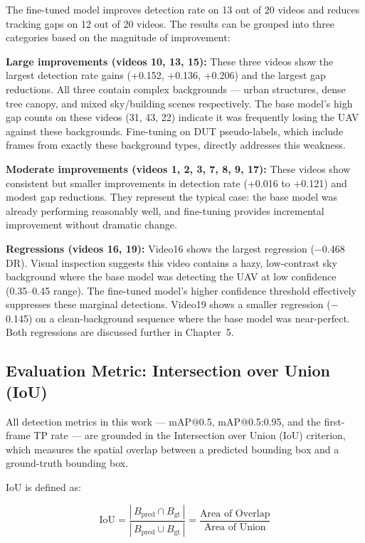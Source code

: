 \documentclass[12pt,a4paper]{report}
\begin{document}
The fine-tuned model improves detection rate on 13 out of 20 videos and
reduces tracking gaps on 12 out of 20 videos. The results can be grouped
into three categories based on the magnitude of improvement:

\textbf{Large improvements (videos 10, 13, 15):}
These three videos show the largest detection rate gains (+0.152, +0.136,
+0.206) and the largest gap reductions. All three contain complex backgrounds
--- urban structures, dense tree canopy, and mixed sky/building scenes
respectively. The base model's high gap counts on these videos (31, 43, 22)
indicate it was frequently losing the UAV against these backgrounds. Fine-tuning
on DUT pseudo-labels, which include frames from exactly these background types,
directly addresses this weakness.

\textbf{Moderate improvements (videos 1, 2, 3, 7, 8, 9, 17):}
These videos show consistent but smaller improvements in detection rate
(+0.016 to +0.121) and modest gap reductions. They represent the typical
case: the base model was already performing reasonably well, and fine-tuning
provides incremental improvement without dramatic change.

\textbf{Regressions (videos 16, 19):}
Video16 shows the largest regression ($-$0.468 DR). Visual inspection
suggests this video contains a hazy, low-contrast sky background where
the base model was detecting the UAV at low confidence (0.35--0.45 range).
The fine-tuned model's higher confidence threshold effectively suppresses
these marginal detections. Video19 shows a smaller regression ($-$0.145)
on a clean-background sequence where the base model was near-perfect.
Both regressions are discussed further in Chapter~5.

\subsection{Evaluation Metric: Intersection over Union (IoU)}

All detection metrics in this work --- mAP@0.5, mAP@0.5:0.95, and the
first-frame TP rate --- are grounded in the Intersection over Union (IoU)
criterion, which measures the spatial overlap between a predicted bounding
box and a ground-truth bounding box.

IoU is defined as:

\begin{equation}
\text{IoU} = \frac{|\, B_{\text{pred}} \cap B_{\text{gt}} \,|}{|\, B_{\text{pred}} \cup B_{\text{gt}} \,|}
= \frac{\text{Area of Overlap}}{\text{Area of Union}}
\label{eq:iou}
\end{equation}
\end{document}

